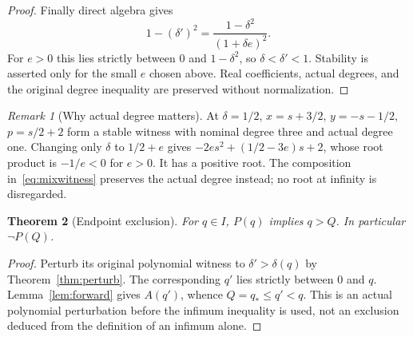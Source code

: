\documentclass[11pt,a4paper]{article}
\newtheorem{theorem}{Theorem}[section]
\theoremstyle{definition}\newtheorem{definition}[theorem]{Definition}
\theoremstyle{remark}\newtheorem{remark}[theorem]{Remark}
\begin{document}
\begin{proof}
Finally direct algebra gives
\begin{equation}\label{eq:direction}
 1-(\delta')^2=\frac{1-\delta^2}{(1+\delta e)^2}.
\end{equation}
For $e>0$ this lies strictly between $0$ and $1-\delta^2$, so
$\delta<\delta'<1$. Stability is asserted only for the small $e$
chosen above. Real coefficients, actual degrees, and the original
degree inequality are preserved without normalization.
\end{proof}

\begin{remark}[Why actual degree matters]
At $\delta=1/2$, $x=s+3/2$, $y=-s-1/2$, $p=s/2+2$ form a stable
witness with nominal degree three and actual degree one. Changing only
$\delta$ to $1/2+e$ gives
$-2es^2+(1/2-3e)s+2$, whose root product is $-1/e<0$ for $e>0$.
It has a positive root. The composition in~\eqref{eq:mixwitness}
preserves the actual degree instead; no root at infinity is disregarded.
\end{remark}

\begin{theorem}[Endpoint exclusion]\label{thm:endpoint}
For $q\in I$, $P(q)$ implies $q>Q$. In particular $\neg P(Q)$.
\end{theorem}
\begin{proof}
Perturb its original polynomial witness to $\delta'>\delta(q)$ by
Theorem~\ref{thm:perturb}. The corresponding $q'$ lies strictly between
$0$ and $q$. Lemma~\ref{lem:forward} gives $A(q')$, whence
$Q=q_*\leq q'<q$. This is an actual polynomial perturbation before
the infimum inequality is used, not an exclusion deduced from the
definition of an infimum alone.
\end{proof}
\end{document}
